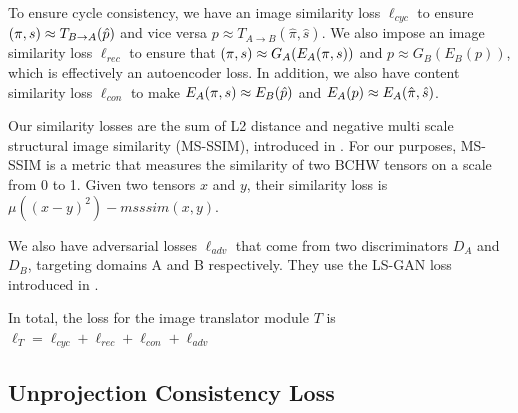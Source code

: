 \documentclass{article}
\begin{document}
To ensure cycle consistency, we have an image similarity loss $\ell_{cyc}$ to ensure
$(\pi,s) \approx T_{B\rightarrow A}(\hat{p})$
and vice versa
$p \approx T_{A\rightarrow B}(\hat{\pi},\hat{s})$.
We also impose an image similarity loss $\ell_{rec}$ to ensure that $(\pi,s) \approx G_A(E_A(\pi,s))$ and $p \approx G_B(E_B(p))$, which is effectively an autoencoder loss. 
In addition, we also have content similarity loss $ \ell_{con}$ to make 
$E_A(\pi,s) \approx E_B(\hat{p})$ and $E_A(p) \approx E_A(\hat{\pi},\hat{s})$.

Our similarity losses are the sum of L2 distance and negative multi scale structural image similarity (MS-SSIM), introduced in \citep{msssim}. For our purposes, MS-SSIM is a metric that measures the similarity of two BCHW tensors on a scale from 0 to 1. Given two tensors $x$ and $y$, their similarity loss is $\mu\left((x-y)^2\right) - msssim(x,y)$. 

We also have adversarial losses $\ell_{adv}$ that come from two discriminators $D_A$ and $D_B$, targeting domains A and B respectively. They use the LS-GAN loss introduced in \citep{lsgan}.

In total, the loss for the image translator module $T$ is $\ell_T=\ell_{cyc}+\ell_{rec}+\ell_{con}+\ell_{adv}$










\subsection{Unprojection Consistency Loss}
\end{document}
